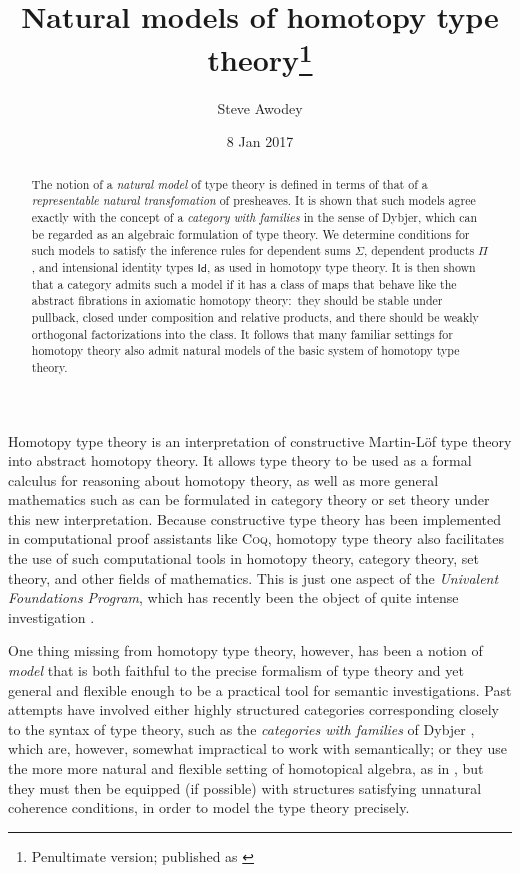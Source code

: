 \documentclass[12pt]{article}
\newcommand{\Id}{\mathsf{Id}}
\theoremstyle{definition}
\begin{document}

\title{Natural models of homotopy type theory\thanks{
Penultimate version; published as \cite{awodeyNatural}}}
\author{Steve Awodey}
\date{8 Jan 2017}

\maketitle

\begin{abstract}
\noindent The notion of a \emph{natural model} of type theory is defined in terms of that of a \emph{representable natural transfomation} of presheaves.  It is shown that such models agree exactly with the concept of a \emph{category with families} in the sense of Dybjer, which can be regarded as an algebraic formulation of type theory.  We determine conditions for such models to satisfy the inference rules for dependent sums $\Sigma$, dependent products $\Pi$, and intensional identity types $\Id$, as used in homotopy type theory.  It is then shown that a category admits such a model if it has a class of maps that behave like the abstract fibrations in axiomatic homotopy theory:\ they should be stable under pullback, closed under composition and relative products, and there should be weakly orthogonal factorizations into the class.  It follows that many familiar settings for homotopy theory also admit natural models of the basic system of homotopy type theory.
\end{abstract}


\noindent Homotopy type theory is an interpretation of constructive Martin-L\"of type theory \cite{ML}  into abstract homotopy theory.  It allows type theory to be used as a formal calculus for reasoning about homotopy theory, as well as more general mathematics such as can be formulated in category theory or set theory under this new interpretation.  Because constructive type theory has been implemented in computational proof assistants like \textsc{Coq}, homotopy type theory also facilitates the use of such computational tools in homotopy theory, category theory, set theory, and other fields of mathematics.  This is just one aspect of the \emph{Univalent Foundations Program}, which has recently been the object of quite intense investigation \cite{HoTTbook}.

One thing missing from homotopy type theory, however, has been a notion of \emph{model} that is both faithful to the precise formalism of type theory and yet general and flexible enough to be a practical tool for semantic investigations.  Past attempts have involved either highly structured categories corresponding closely to the syntax of type theory, such as the \emph{categories with families} of Dybjer \cite{CwF}, which are, however, somewhat impractical to work with semantically; or they use the more more natural and flexible setting of homotopical algebra, as in \cite{AW,GvdB}, but they must then be equipped (if possible) with structures satisfying unnatural coherence conditions, in order to model the type theory precisely.
\end{document}
